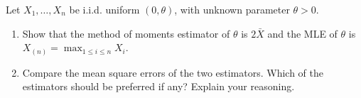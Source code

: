 
\begin{exercise}

Let $X_1,\dots,X_n$ be i.i.d. uniform $(0,\theta)$, with unknown parameter $\theta > 0$.

\begin{enumerate}[label = (\alph*)]
  \item Show that the method of moments estimator of $\theta$ is $2\bar{X}$ and the MLE
  of $\theta$ is $X_{(n)} = \max_{1 \leq i \leq n} X_i$.
  \item Compare the mean square errors of the two estimators. Which of the estimators
  should be preferred if any? Explain your reasoning.
\end{enumerate}

\end{exercise}


